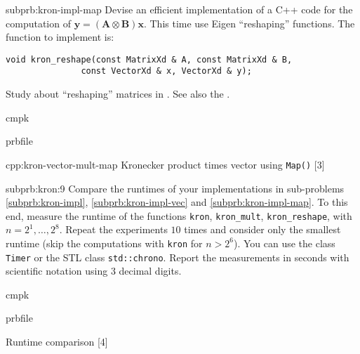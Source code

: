 \begin{samproblem}
\begin{subproblem}{subprb:kron-impl-map}
  Devise an efficient implementation of a C++ code for the computation of
  $\mathbf{y} = (\mathbf{A} \otimes \mathbf{B}) \mathbf{x}$. This time use
  Eigen ``reshaping'' functions. The function to implement is:
  \begin{lstlisting}[style=cppsimple]
void kron_reshape(const MatrixXd & A, const MatrixXd & B,
               const VectorXd & x, VectorXd & y);
  \end{lstlisting}
  Study  about ``reshaping'' matrices in \eigen{}. See also the
  .

\begin{samwriteprbpart}{cmpk}
  \begin{writeverbatim}{prbfile}
    \begin{samsolution}
      \begin{samcode}[C++11-code]{cpp:kron-vector-mult-map}
        {Kronecker product times vector using \texttt{Map()}}
        [3]
      \end{samcode}
    \end{samsolution}
  \end{writeverbatim}
\end{samwriteprbpart}
\end{subproblem}

\begin{subproblem}{subprb:kron:9}
  Compare the runtimes of your implementations in sub-problems
  \ref{subprb:kron-impl}, \ref{subprb:kron-impl-vec} and \ref{subprb:kron-impl-map}.
  To this end, measure the runtime of the functions \texttt{kron}, \texttt{kron\_mult},
  \texttt{kron\_reshape},
  with $n = 2^1,\dots,2^8$. Repeat the experiments $10$ times and consider only the smallest
  runtime (skip the computations with \texttt{kron} for $n > 2^6$).
  You can use the class \texttt{Timer} or the STL class \texttt{std::chrono}.
  Report the measurements in seconds with scientific notation using 3 decimal digits.

\begin{samwriteprbpart}{cmpk}
  \begin{writeverbatim}{prbfile}
    \begin{samsolution}
      \begin{samcode}[C++11-code]{}{Runtime comparison}
        [4]
      \end{samcode}


\end{samsolution}
\end{writeverbatim}
\end{samwriteprbpart}
\end{subproblem}
\end{samproblem}

